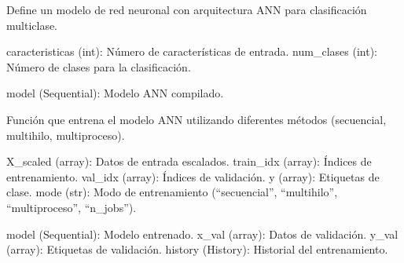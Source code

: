 \documentclass[letterpaper,10pt,spanish]{sphinxmanual}
\begin{document}
\label{\detokenize{Reduccion_Dimension:module-entrenar_modelos}}

\begin{fulllineitems}
\label{\detokenize{Reduccion_Dimension:entrenar_modelos.define_model_ann}}
\pysigstartsignatures
\pysiglinewithargsret
{}
{\sphinxparamcomma {}}
{}
\pysigstopsignatures
\sphinxAtStartPar
Define un modelo de red neuronal con arquitectura ANN para clasificación multiclase.
\begin{description}
\sphinxAtStartPar
caracteristicas (int): Número de características de entrada.
num\_clases (int): Número de clases para la clasificación.

\sphinxAtStartPar
model (Sequential): Modelo ANN compilado.

\end{description}

\end{fulllineitems}


\begin{fulllineitems}
\label{\detokenize{Reduccion_Dimension:entrenar_modelos.entrenar_modelo_ann}}
\pysigstartsignatures
\pysiglinewithargsret
{}
{\sphinxparamcomma {}\sphinxparamcomma {}\sphinxparamcomma {}\sphinxparamcomma {}}
{}
\pysigstopsignatures
\sphinxAtStartPar
Función que entrena el modelo ANN utilizando diferentes métodos (secuencial, multihilo, multiproceso).
\begin{description}
\sphinxAtStartPar
X\_scaled (array): Datos de entrada escalados.
train\_idx (array): Índices de entrenamiento.
val\_idx (array): Índices de validación.
y (array): Etiquetas de clase.
mode (str): Modo de entrenamiento (“secuencial”, “multihilo”, “multiproceso”, “n\_jobs”).

\sphinxAtStartPar
model (Sequential): Modelo entrenado.
x\_val (array): Datos de validación.
y\_val (array): Etiquetas de validación.
history (History): Historial del entrenamiento.

\end{description}

\end{fulllineitems}
\end{document}

